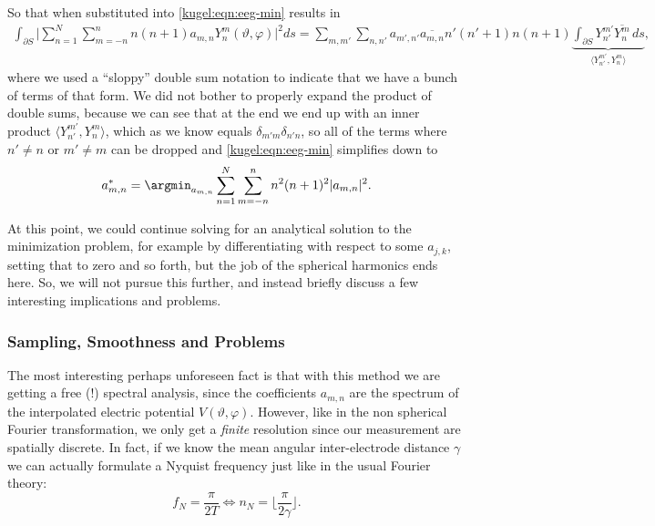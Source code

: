 So that when substituted into \eqref{kugel:eqn:eeg-min} results in
\begin{align*}
  \int_{\partial S} \biggl|
    \sum_{n=1}^N \sum_{m=-n}^n n(n+1) a_{m,n}
    Y^m_n(\vartheta, \varphi)
  \biggr|^2 ds
  = \sum_{m, m'} \sum_{n, n'} a_{m',n'} \overline{a_{m,n}}
    n'(n'+1) n(n+1)
    \underbrace{\int_{\partial S} Y^{m'}_{n'} \overline{Y^m_n} \, ds}_{
      \langle Y^{m'}_{n'}, Y^m_n \rangle
    },
\end{align*}
where we used a ``sloppy'' double sum notation to indicate that we have a bunch
of terms of that form. We did not bother to properly expand the product of
double sums, because we can see that at the end we end up with an inner product
$\langle Y^{m'}_{n'}, Y^m_n \rangle$, which as we know equals $\delta_{m'm}
\delta_{n'n}$, so all of the terms where $n' \neq n$ or $m' \neq m$ can be
dropped and \eqref{kugel:eqn:eeg-min} simplifies down to
\nocite{pascual-marqui_current_1988}
\begin{equation}
  a^*_{m,n} = \argmin_{a_{m,n}} 
    \sum_{n=1}^N \sum_{m=-n}^n n^2 (n+1)^2 |a_{m,n}|^2.
\end{equation}

At this point, we could continue solving for an analytical solution to the
minimization problem, for example by differentiating with respect to some
$a_{j,k}$, setting that to zero and so forth, but the job of the spherical
harmonics ends here. So, we will not pursue this further, and instead briefly
discuss a few interesting implications and problems. 

\subsubsection{Sampling, Smoothness and Problems}
\nocite{wingeier_spherical_2001, ruffini_spherical_2002}

The most interesting perhaps unforeseen fact is that with this method we are
getting a free (!) spectral analysis, since the coefficients $a_{m,n}$ are the
spectrum of the interpolated electric potential $V(\vartheta, \varphi)$.
However, like in the non spherical Fourier transformation, we only get a
\emph{finite} resolution since our measurement are spatially discrete. In fact,
if we know the mean angular inter-electrode distance $\gamma$ we can actually
formulate a Nyquist frequency just like in the usual Fourier theory:
\begin{equation}
  f_N = \frac{\pi}{2T}
  \iff
  n_N = \biggl\lfloor \frac{\pi}{2\gamma} \biggr\rfloor.
\end{equation}

